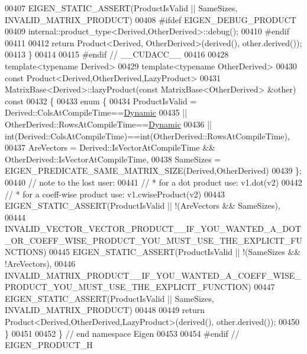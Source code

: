 \begin{DoxyCode}
00407   EIGEN\_STATIC\_ASSERT(ProductIsValid || SameSizes, INVALID\_MATRIX\_PRODUCT)
00408 \textcolor{preprocessor}{#ifdef EIGEN\_DEBUG\_PRODUCT}
00409   internal::product\_type<Derived,OtherDerived>::debug();
00410 \textcolor{preprocessor}{#endif}
00411 
00412   \textcolor{keywordflow}{return} Product<Derived, OtherDerived>(derived(), other.derived());
00413 \}
00414 
00415 \textcolor{preprocessor}{#endif // \_\_CUDACC\_\_}
00416 
00428 \textcolor{keyword}{template}<\textcolor{keyword}{typename} Derived>
00429 \textcolor{keyword}{template}<\textcolor{keyword}{typename} OtherDerived>
00430 \textcolor{keyword}{const} Product<Derived,OtherDerived,LazyProduct>
00431 MatrixBase<Derived>::lazyProduct(\textcolor{keyword}{const} MatrixBase<OtherDerived> &other)\textcolor{keyword}{ const}
00432 \textcolor{keyword}{}\{
00433   \textcolor{keyword}{enum} \{
00434     ProductIsValid =  Derived::ColsAtCompileTime==\hyperlink{namespace_eigen_ad81fa7195215a0ce30017dfac309f0b2}{Dynamic}
00435                    || OtherDerived::RowsAtCompileTime==\hyperlink{namespace_eigen_ad81fa7195215a0ce30017dfac309f0b2}{Dynamic}
00436                    || int(Derived::ColsAtCompileTime)==int(OtherDerived::RowsAtCompileTime),
00437     AreVectors = Derived::IsVectorAtCompileTime && OtherDerived::IsVectorAtCompileTime,
00438     SameSizes = EIGEN\_PREDICATE\_SAME\_MATRIX\_SIZE(Derived,OtherDerived)
00439   \};
00440   \textcolor{comment}{// note to the lost user:}
00441   \textcolor{comment}{//    * for a dot product use: v1.dot(v2)}
00442   \textcolor{comment}{//    * for a coeff-wise product use: v1.cwiseProduct(v2)}
00443   EIGEN\_STATIC\_ASSERT(ProductIsValid || !(AreVectors && SameSizes),
00444     
      INVALID\_VECTOR\_VECTOR\_PRODUCT\_\_IF\_YOU\_WANTED\_A\_DOT\_OR\_COEFF\_WISE\_PRODUCT\_YOU\_MUST\_USE\_THE\_EXPLICIT\_FUNCTIONS)
00445   EIGEN\_STATIC\_ASSERT(ProductIsValid || !(SameSizes && !AreVectors),
00446     INVALID\_MATRIX\_PRODUCT\_\_IF\_YOU\_WANTED\_A\_COEFF\_WISE\_PRODUCT\_YOU\_MUST\_USE\_THE\_EXPLICIT\_FUNCTION)
00447   EIGEN\_STATIC\_ASSERT(ProductIsValid || SameSizes, INVALID\_MATRIX\_PRODUCT)
00448 
00449   \textcolor{keywordflow}{return} Product<Derived,OtherDerived,LazyProduct>(derived(), other.derived());
00450 \}
00451 
00452 \} \textcolor{comment}{// end namespace Eigen}
00453 
00454 \textcolor{preprocessor}{#endif // EIGEN\_PRODUCT\_H}
\end{DoxyCode}
